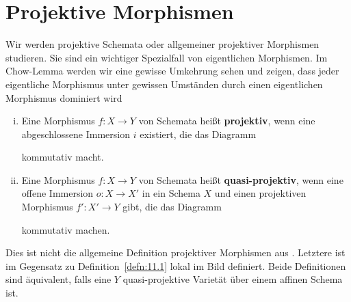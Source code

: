 
\chapter{Projektive Morphismen}

Wir werden projektive Schemata oder allgemeiner projektiver Morphismen studieren. Sie sind ein wichtiger Spezialfall von eigentlichen Morphismen. Im Chow-Lemma werden wir eine gewisse Umkehrung sehen und zeigen, dass jeder
eigentliche Morphismus unter gewissen Umständen durch einen eigentlichen Morphismus dominiert wird %

\begin{defn}
	\label{defn:11.1}
	\begin{enumerate}[i)]
	\item Eine Morphismus $f \colon X \to Y$ von Schemata heißt \textbf{projektiv}, wenn eine abgeschlossene Immersion $i$ existiert, die das Diagramm
		\begin{center}
		\end{center}
		kommutativ macht.
	\item Eine Morphismus $f \colon X \to Y$ von Schemata heißt \textbf{quasi-projektiv}, wenn eine offene Immersion $o \colon X \to X'$ in ein Schema $X$ und einen projektiven Morphismus $f' \colon X' \to Y$ gibt, die das Diagramm
		\begin{center}
		\end{center}
		kommutativ machen.
	\end{enumerate}
\end{defn}

\begin{warn}
	\label{warn:11.2}
	Dies ist nicht die allgemeine Definition projektiver Morphismen aus \cite[5.5]{grothendieck1971elements}. Letztere ist im Gegensatz zu Definition~\ref{defn:11.1} lokal im Bild definiert.
	Beide Definitionen sind äquivalent, falls eine $Y$ quasi-projektive Varietät über einem affinen Schema ist.
\end{warn}

